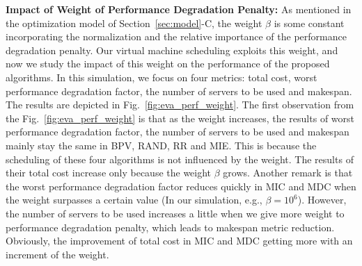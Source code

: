 \documentclass[10pt,journal]{IEEEtran}
\begin{document}
\textbf{Impact of Weight of Performance Degradation Penalty:} As mentioned in the optimization model of Section~\ref{sec:model}-C, the weight $\beta$ is some constant incorporating the normalization and the relative importance of the performance degradation penalty. Our virtual machine scheduling exploits this weight, and now we study the impact of this weight on the performance of the proposed algorithms. In this simulation, we focus on four metrics: total cost, worst performance degradation factor, the number of servers to be used and makespan. The results are depicted in Fig.~\ref{fig:eva_perf_weight}. The first observation from the Fig.~\ref{fig:eva_perf_weight} is that as the weight increases, the results of worst performance degradation factor, the number of servers to be used and makespan mainly stay the same in BPV, RAND, RR and MIE. This is because the scheduling of these four algorithms is not influenced by the weight. The results of their total cost increase only because the weight $\beta$ grows. Another remark is that the worst performance degradation factor reduces quickly in MIC and MDC when the weight surpasses a certain value (In our simulation, e.g., $\beta=10^6$). However, the number of servers to be used increases a little when we give more weight to performance degradation penalty, which leads to makespan metric reduction. Obviously, the improvement of total cost in MIC and MDC getting more with an increment of the weight.
\end{document}
